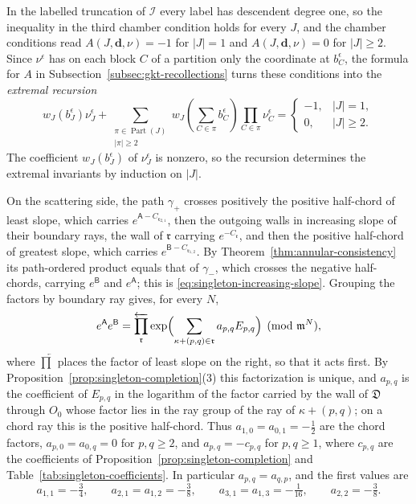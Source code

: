 In the labelled truncation of $\mathcal I$ every label has descendent degree
one, so the inequality in
the third chamber condition holds for every $J$, and the chamber conditions
read $A(J,\mathbf d,\nu)=-1$ for $|J|=1$ and $A(J,\mathbf d,\nu)=0$ for
$|J|\geq2$.  Since $\nu^\epsilon$ has on each block $C$ of a partition only
the coordinate at $b_C^\epsilon$, the formula for $A$ in
Subsection~\ref{subsec:gkt-recollections} turns these conditions into the
\emph{extremal recursion}
\begin{equation}\label{eq:endpoint-recursion}
 w_J(b_J^\epsilon)\nu_J^\epsilon
 +\sum_{\substack{\pi\in\operatorname{Part}(J)\\|\pi|\geq2}}
 w_J\!\left(\sum_{C\in\pi}b_C^\epsilon\right)
 \prod_{C\in\pi}\nu_C^\epsilon
 =\begin{cases}-1,&|J|=1,\\0,&|J|\geq2.
 \end{cases}
\end{equation}
The coefficient $w_J(b_J^\epsilon)$ of $\nu_J^\epsilon$ is nonzero, so the
recursion determines the extremal invariants by induction on $|J|$.

On the scattering side, the path $\gamma_+$ crosses positively the positive
half-chord of least slope, which carries $e^{\mathsf A-C_{\mathfrak r_{2,1}}}$,
then the outgoing walls in increasing slope of their boundary rays, the
wall of $\mathfrak r$
carrying $e^{-C_{\mathfrak r}}$, and then the positive half-chord of greatest
slope, which carries $e^{\mathsf B-C_{\mathfrak r_{1,2}}}$.  By
Theorem~\ref{thm:annular-consistency} its path-ordered product equals that of
$\gamma_-$, which crosses the negative half-chords, carrying $e^{\mathsf B}$
and $e^{\mathsf A}$; this is \eqref{eq:singleton-increasing-slope}.  Grouping
the factors by boundary ray gives, for every $N$,
\begin{equation}\label{eq:increasing-slope-factorization}
 e^{\mathsf A}e^{\mathsf B}
 =\overleftarrow{\prod_{\mathfrak r}}
 \exp\Bigl(\sum_{\kappa+(p,q)\in\mathfrak r}a_{p,q}E_{p,q}\Bigr)
 \pmod{\mathfrak m^N},
\end{equation}
where $\overleftarrow{\prod}$ places the factor of least slope on the right,
so that it acts first.  By Proposition~\ref{prop:singleton-completion}(3) this
factorization is unique, and $a_{p,q}$ is the coefficient of $E_{p,q}$ in the
logarithm of the factor carried by the wall of $\mathfrak D$ through $O_0$
whose factor lies in the ray group of the ray of $\kappa+(p,q)$; on a chord
ray this is the positive half-chord.  Thus $a_{1,0}=a_{0,1}=-\frac12$ are the
chord factors, $a_{p,0}=a_{0,q}=0$ for $p,q\geq2$, and $a_{p,q}=-c_{p,q}$ for
$p,q\geq1$, where $c_{p,q}$ are the coefficients of
Proposition~\ref{prop:singleton-completion} and
Table~\ref{tab:singleton-coefficients}.  In particular $a_{p,q}=a_{q,p}$,
and the first values are
\[
 a_{1,1}=-\tfrac34,
 \qquad a_{2,1}=a_{1,2}=-\tfrac38,
 \qquad a_{3,1}=a_{1,3}=-\tfrac1{16},
 \qquad a_{2,2}=-\tfrac38.
\]

